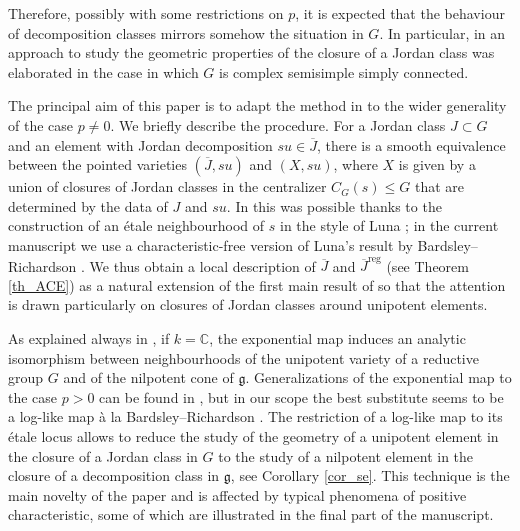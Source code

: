 \documentclass[12pt]{amsart}
\theoremstyle{definition}
\theoremstyle{remark}
\newcommand{\C}{\mathbb{C}}
\newcommand{\g}{\mathfrak{g}}
\newcommand{\reg}{{\operatorname{reg}}}
\begin{document}
Therefore, possibly with some restrictions on $p$, it is expected that the behaviour of decomposition classes mirrors somehow the situation in $G$.
In particular, in \cite{ACE} an approach to study the geometric properties of the closure of a Jordan class was elaborated in the case in which $G$ is complex semisimple simply connected.

The principal aim of this paper is to adapt the method in \cite{ACE} to the wider generality of the case $p \neq 0$.
We briefly describe the procedure.
 For a Jordan class $J \subset G$ and an element with Jordan decomposition $su \in \overline{J}$, there is a smooth equivalence between the pointed varieties $(\overline{J}, su)$ and $(X, su)$, where $X$ is given by a  union of closures of Jordan classes in the centralizer $C_G(s) \leq G$ that are determined by the data of $J$ and $su$. 
In \cite{ACE} this was possible thanks to the construction of an \'etale neighbourhood of $s$ in the style of Luna \cite{Luna}; in the current manuscript we use a characteristic-free version of Luna's result by Bardsley--Richardson \cite{BR}.
We thus obtain a local description of $\overline{J}$ and $\overline{J}^\reg$ (see Theorem \ref{th_ACE}) as a natural extension of the first main result of \cite{ACE} so that the attention is drawn particularly on closures of Jordan classes around unipotent elements.

As explained always in \cite[\S 5]{ACE}, if $k = \C$, the exponential map induces an analytic isomorphism between neighbourhoods of the unipotent variety of a reductive group $G$ and of the nilpotent cone of $\g$.
Generalizations of the exponential map to the case $p > 0$ can be found in \cite{Sobaje, SobTay}, but in our scope the best substitute seems to be a log-like map \`a la Bardsley--Richardson \cite{BR, McN_NOgood}.
The restriction of a log-like map to its \'etale locus allows to reduce the study of the geometry of a unipotent element in the closure of a Jordan class in $G$ to the study of a nilpotent element in the closure of a decomposition class in $\g$, see Corollary \ref{cor_se}.
This technique is the main novelty of the paper and is affected by typical phenomena of positive characteristic, some of which are illustrated in the final part of the manuscript. 
\end{document}
